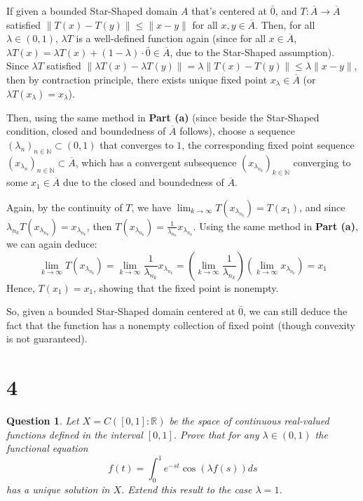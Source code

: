 \documentclass{article}
\newtheorem{question}{Question}
\begin{document}
\begin{itemize}
    If given a bounded Star-Shaped domain $A$ that's centered at $\bar{0}$, and $T:\overline{A}\rightarrow\overline{A}$ satisfied $\|T(x)-T(y)\|\leq \|x-y\|$ for all $x,y\in \overline{A}$.
    Then, for all $\lambda\in (0,1)$, $\lambda T$ is a well-defined function again (since for all $x\in \overline{A}$, $\lambda T(x) = \lambda T(x)+(1-\lambda)\cdot \bar{0} \in \overline{A}$, due to the Star-Shaped assumption).
    Since $\lambda T$ satisfied $\|\lambda T(x)-\lambda T(y)\|= \lambda \|T(x)-T(y)\|\leq \lambda\|x-y\|$, then by contraction principle, there exists unique fixed point $x_\lambda\in\overline{A}$ (or $\lambda T(x_\lambda)=x_\lambda$).

    Then, using the same method in \textbf{Part (a)} (since beside the Star-Shaped condition, closed and boundedness of $\overline{A}$ follows), choose a sequence $(\lambda_n)_{n\in\mathbb{N}}\subset (0,1)$ that converges to $1$,
    the corresponding fixed point sequence $(x_{\lambda_n})_{n\in\mathbb{N}}\subset \overline{A}$, which has a convergent subsequence $(x_{\lambda_{n_k}})_{k\in\mathbb{N}}$ converging to some $x_1\in \overline{A}$ due to the closed and boundedness of $\overline{A}$.

    Again, by the continuity of $T$, we have $\lim_{k\rightarrow\infty}T(x_{\lambda_{n_k}})=T(x_1)$, and since $\lambda_{n_k}T(x_{\lambda_{n_k}})=x_{\lambda_{n_k}}$, then $T(x_{\lambda_{n_k}})=\frac{1}{\lambda_{n_k}}x_{\lambda_{n_k}}$.
    Using the same method in \textbf{Part (a)}, we can again deduce:
    $$\lim_{k\rightarrow\infty}T(x_{\lambda_{n_k}}) = \lim_{k\rightarrow\infty}\frac{1}{\lambda_{n_k}}x_{\lambda_{n_k}} = \left(\lim_{k\rightarrow\infty}\frac{1}{\lambda_{n_k}}\right)(\lim_{k\rightarrow\infty}x_{\lambda_{n_k}}) = x_1$$
    Hence, $T(x_1)=x_1$, showing that the fixed point is nonempty.

    So, given a bounded Star-Shaped domain centered at $\bar{0}$, we can still deduce the fact that the function has a nonempty collection of fixed point (though convexity is not guaranteed).
\end{itemize}

\break

\section*{4}
\begin{myBox}[]{}
    \begin{question}
        Let $X=C([0,1]:\mathbb{R})$ be the space of continuous real-valued functions defined in the interval $[0,1]$.
        Prove that for any $\lambda\in (0,1)$ the functional equation
        $$f(t)=\int_{0}^{1}e^{-st}\cos(\lambda f(s))ds$$
        has a unique solution in $X$. Extend this result to the case $\lambda=1$.
    \end{question}
\end{myBox}
\end{document}
